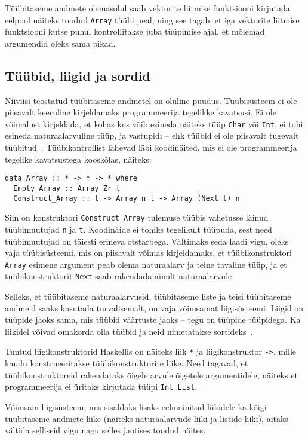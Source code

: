 \documentclass[12pt]{article}
\begin{document}
      Tüübitaseme andmete olemasolul saab vektorite liitmise funktsiooni kirjutada eelpool näiteks toodud \verb!Array! tüübi peal, ning see tagab, et iga vektorite liitmise funktsiooni kutse puhul kontrollitakse juba tüüpimise ajal, et mõlemad argumendid oleks sama pikad.
    \subsection{Tüübid, liigid ja sordid}\label{liiksort}
      Niiviisi teostatud tüübitaseme andmetel on oluline puudus. Tüübisüsteem ei ole piisavalt keeruline kirjeldamaks programmeerija tegelikke kavatsusi. Ei ole võimalust kirjeldada, et kohas kus võib esineda näiteks tüüp \verb!Char! või \verb!Int!, ei tohi esineda naturaalarvuline tüüp, ja vastupidi -- ehk tüübid ei ole piisavalt tugevalt tüübitud~\cite{Giv}. Tüübikontrollist lähevad läbi koodinäited, mis ei ole programmeerija tegelike kavatsustega kooskõlas, näiteks:

      \begin{verbatim}data Array :: * -> * -> * where
  Empty_Array :: Array Zr t
  Construct_Array :: t -> Array n t -> Array (Next t) n\end{verbatim}

      Siin on konstruktori \verb!Construct_Array! tulemuse tüübis vahetusse läinud tüübimuutujad \verb!n! ja \verb!t!. Koodinäide ei tohiks tegelikult tüüpuda, sest need tüübimuutujad on täiesti erineva otstarbega. Vältimaks seda laadi vigu, oleks vaja tüübisüsteemi, mis on piisavalt võimas kirjeldamaks, et tüübikonstruktori \verb!Array! esimene argument peab olema naturaalarv ja teine tavaline tüüp, ja et tüübikonstruktorit \verb!Next! saab rakendada ainult naturaalarvule.

      Selleks, et tüübitaseme naturaalarvusid, tüübitaseme liste ja teisi tüübitaseme andmeid saaks kasutada turvalisemalt, on vaja võimsamat liigisüsteemi. Liigid on tüüpide jaoks sama, mis tüübid väärtuste jaoks -- tegu on tüüpide tüüpidega. Ka liikidel võivad omakorda olla tüübid ja neid nimetatakse sortideks~\cite{Typ}.

      Tuntud liigikonstruktorid Haskellis on näiteks liik \verb!*! ja liigikonstruktor \verb!->!, mille kaudu konstrueeritakse tüübikonstruktorite liike. Need tagavad, et tüübikonstruktoreid rakendataks õigele arvule õigetele argumentidele, näiteks et programmeerija ei üritaks kirjutada tüüpi \verb!Int List!.

      Võimsam liigisüsteem, mis sisaldaks lisaks eelmainitud liikidele ka kõigi tüübitaseme andmete liike (näiteks naturaalarvude liiki ja listide liiki), aitaks vältida selliseid vigu nagu selles jaotises toodud näites.
\end{document}
